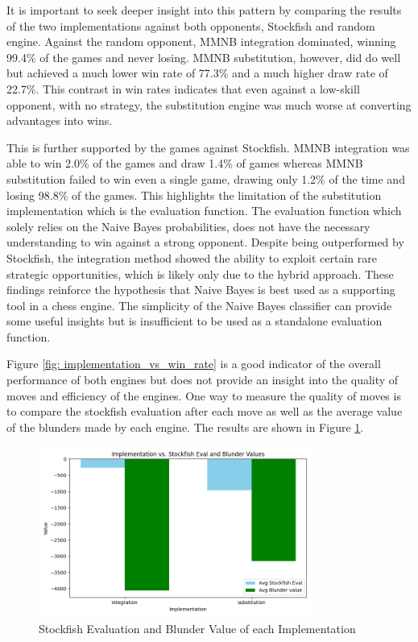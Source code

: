 It is important to seek deeper insight into this pattern by comparing the results of the two implementations against both opponents, Stockfish and random engine. Against the random opponent, MMNB integration dominated, winning 99.4\% of the games and never losing. MMNB substitution, however, did do well but achieved a much lower win rate of 77.3\% and a much higher draw rate of 22.7\%. This contrast in win rates indicates that even against a low-skill opponent, with no strategy, the substitution engine was much worse at converting advantages into wins.

This is further supported by the games against Stockfish. MMNB integration was able to win 2.0\% of the games and draw 1.4\% of games whereas MMNB substitution failed to win even a single game, drawing only 1.2\% of the time and losing 98.8\% of the games. This highlights the limitation of the substitution implementation which is the evaluation function. The evaluation function which solely relies on the Naive Bayes probabilities, does not have the necessary understanding to win against a strong opponent. Despite being outperformed by Stockfish, the integration method showed the ability to exploit certain rare strategic opportunities, which is likely only due to the hybrid approach. These findings reinforce the hypothesis that Naive Bayes is best used as a supporting tool in a chess engine. The simplicity of the Naive Bayes classifier can provide some useful insights but is insufficient to be used as a standalone evaluation function.

Figure \ref{fig: implementation_vs_win_rate} is a good indicator of the overall performance of both engines but does not provide an insight into the quality of moves and efficiency of the engines. One way to measure the quality of moves is to compare the stockfish evaluation after each move as well as the average value of the blunders made by each engine. The results are shown in Figure \ref{fig: implementation_vs_stockfish_eval_and_blunder_value}.

\begin{figure}[H]
    \centering
    \includegraphics[width=0.8\textwidth]{images/plots/implementation/Implementation_vs_stockfish_eval_and_blunder_value.png}
    \caption{Stockfish Evaluation and Blunder Value of each Implementation}
    \label{fig: implementation_vs_stockfish_eval_and_blunder_value}
\end{figure}

